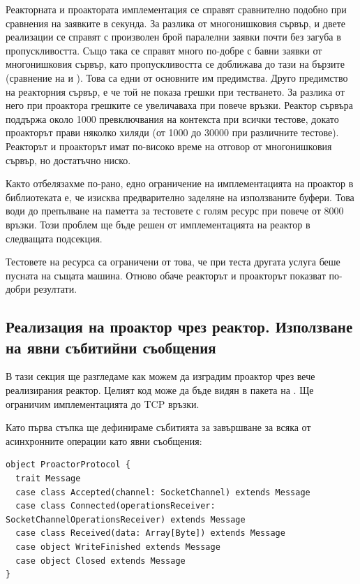 Реакторната и проактората имплементация се справят сравнително подобно при сравнения на заявките в секунда. За разлика от многонишковия сървър, и двете реализации се справят с произволен брой паралелни заявки почти без загуба в пропускливостта. Също така се справят много по-добре с бавни заявки от многонишковия сървър, като пропускливостта се доближава до тази на бързите (сравнение на \code{/} и ). Това са едни от основните им предимства. Друго предимство на реакторния сървър, е че той не показа грешки при тестването. За разлика от него при проактора грешките се увеличаваха при повече връзки. Реактор сървъра поддържа около 1000 превключвания на контекста при всички тестове, докато проакторът прави няколко хиляди (от 1000 до 30000 при различните тестове). Реакторът и проакторът имат по-високо време на отговор от многонишковия сървър, но достатъчно ниско.

Както отбелязахме по-рано, едно ограничение на имплементацията на проактор в  библиотеката е, че изисква предварително заделяне на използваните буфери. Това води до препълване на паметта за тестовете с голям ресурс при повече от 8000 връзки. Този проблем ще бъде решен от имплементацията на реактор в следващата подсекция.

Тестовете на ресурса  са ограничени от това, че при теста другата услуга беше пусната на същата машина. Отново обаче реакторът и проакторът показват по-добри резултати.

\subsection{Реализация на проактор чрез реактор. Използване на явни събитийни съобщения}
\label{sec:proactor-using-reactor-messaging}

В тази секция ще разгледаме как можем да изградим проактор чрез вече реализирания реактор. Целият код може да бъде видян в пакета  на . Ще ограничим имплементацията до TCP връзки.

Като първа стъпка ще дефинираме събитията за завършване за всяка от асинхронните операции като явни съобщения:

\begin{lstlisting}
object ProactorProtocol {
  trait Message
  case class Accepted(channel: SocketChannel) extends Message
  case class Connected(operationsReceiver: SocketChannelOperationsReceiver) extends Message
  case class Received(data: Array[Byte]) extends Message
  case object WriteFinished extends Message
  case object Closed extends Message
}
\end{lstlisting}

